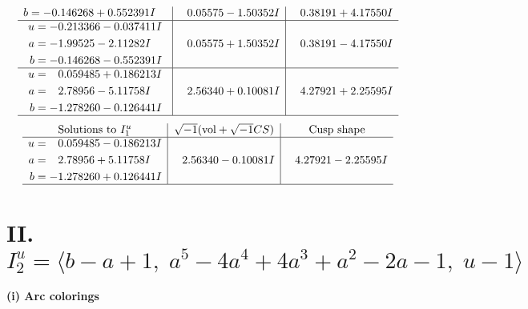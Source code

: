 \documentclass[1p]{elsarticle_modified}
\theoremstyle{definition}
\newcommand{\I}{\sqrt{-1}}
\begin{document}
$$\begin{array}{c|c|c}
\begin{aligned}
b &= -0.146268 + 0.552391 I\end{aligned}
 & \phantom{-}0.05575 - 1.50352 I & \phantom{-}0.38191 + 4.17550 I \\ \hline\begin{aligned}
u &= -0.213366 - 0.037411 I \\
a &= -1.99525 - 2.11282 I \\
b &= -0.146268 - 0.552391 I\end{aligned}
 & \phantom{-}0.05575 + 1.50352 I & \phantom{-}0.38191 - 4.17550 I \\ \hline\begin{aligned}
u &= \phantom{-}0.059485 + 0.186213 I \\
a &= \phantom{-}2.78956 - 5.11758 I \\
b &= -1.278260 - 0.126441 I\end{aligned}
 & \phantom{-}2.56340 + 0.10081 I & \phantom{-}4.27921 + 2.25595 I\\
 \hline 
 \end{array}$$\newpage$$\begin{array}{c|c|c}  
\text{Solutions to }I^u_{1}& \I (\text{vol} + \sqrt{-1}CS) & \text{Cusp shape}\\
 \hline 
\begin{aligned}
u &= \phantom{-}0.059485 - 0.186213 I \\
a &= \phantom{-}2.78956 + 5.11758 I \\
b &= -1.278260 + 0.126441 I\end{aligned}
 & \phantom{-}2.56340 - 0.10081 I & \phantom{-}4.27921 - 2.25595 I\\
 \hline 
 \end{array}$$\newpage\newpage\renewcommand{\arraystretch}{1}
\centering \section*{II. $I^u_{2}= \langle b- a+1,\;a^5-4 a^4+4 a^3+a^2-2 a-1,\;u-1 \rangle$}
\flushleft \textbf{(i) Arc colorings}\\
\end{document}
